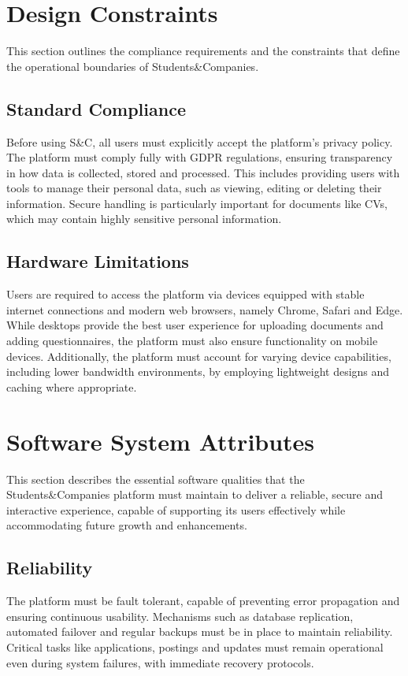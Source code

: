 \section{Design Constraints}
This section outlines the compliance requirements and the constraints that define the operational boundaries of Students\&Companies.

\subsection{Standard Compliance}
Before using S\&C, all users must explicitly accept the platform's privacy policy.
The platform must comply fully with GDPR regulations, ensuring transparency in how data is collected, stored and processed.
This includes providing users with tools to manage their personal data, such as viewing, editing or deleting their information.
Secure handling is particularly important for documents like CVs, which may contain highly sensitive personal information.

\subsection{Hardware Limitations}
Users are required to access the platform via devices equipped with stable internet connections and modern web browsers, namely Chrome, Safari and Edge.
While desktops provide the best user experience for uploading documents and adding questionnaires, the platform must also ensure functionality on mobile devices.
Additionally, the platform must account for varying device capabilities, including lower bandwidth environments, by employing lightweight designs and caching where appropriate.

\section{Software System Attributes}
This section describes the essential software qualities that the Students\&Companies platform must maintain to deliver a reliable, secure and interactive experience, capable of supporting its users effectively while accommodating future growth and enhancements.

\subsection{Reliability}
The platform must be fault tolerant, capable of preventing error propagation and ensuring continuous usability.
Mechanisms such as database replication, automated failover and regular backups must be in place to maintain reliability.
Critical tasks like applications, postings and updates must remain operational even during system failures, with immediate recovery protocols.

